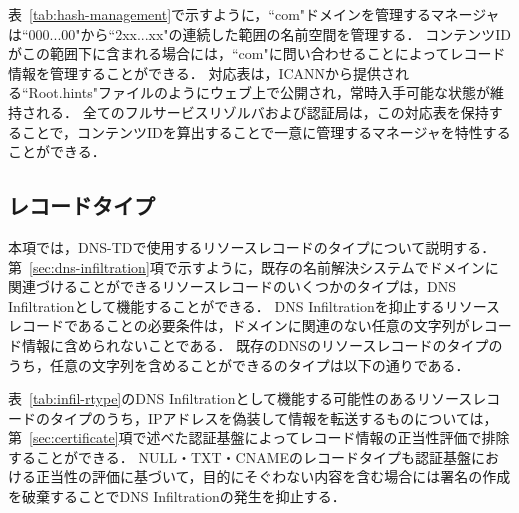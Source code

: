 

表~\ref{tab:hash-management}で示すように，``com"ドメインを管理するマネージャは``000...00"から``2xx...xx"の連続した範囲の名前空間を管理する．
コンテンツIDがこの範囲下に含まれる場合には，``com"に問い合わせることによってレコード情報を管理することができる．
対応表は，ICANNから提供される``Root.hints"ファイルのようにウェブ上で公開され，常時入手可能な状態が維持される．
全てのフルサービスリゾルバおよび認証局は，この対応表を保持することで，コンテンツIDを算出することで一意に管理するマネージャを特性することができる．

\subsection{レコードタイプ}
本項では，DNS-TDで使用するリソースレコードのタイプについて説明する．
第~\ref{sec:dns-infiltration}項で示すように，既存の名前解決システムでドメインに関連づけることができるリソースレコードのいくつかのタイプは，DNS Infiltrationとして機能することができる．
DNS Infiltrationを抑止するリソースレコードであることの必要条件は，ドメインに関連のない任意の文字列がレコード情報に含められないことである．
既存のDNSのリソースレコードのタイプのうち，任意の文字列を含めることができるのタイプは以下の通りである．

表~\ref{tab:infil-rtype}のDNS Infiltrationとして機能する可能性のあるリソースレコードのタイプのうち，IPアドレスを偽装して情報を転送するものについては，第~\ref{sec:certificate}項で述べた認証基盤によってレコード情報の正当性評価で排除することができる．
NULL・TXT・CNAMEのレコードタイプも認証基盤における正当性の評価に基づいて，目的にそぐわない内容を含む場合には署名の作成を破棄することでDNS Infiltrationの発生を抑止する．


